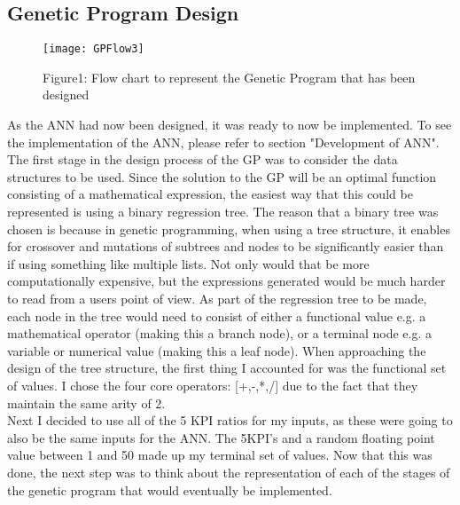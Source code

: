 \documentclass[11pt]{article}
\begin{document}
\subsection{Genetic Program Design}
\begin{figure}[h]
\centering
\texttt{[image: GPFlow3]}
\caption{Figure1: Flow chart to represent the Genetic Program that has been designed} 
\end{figure}
As the ANN had now been designed, it was ready to now be implemented. To see the implementation of the ANN, please refer to section "Development of ANN". The first stage in the design process of the GP was to consider the data structures to be used. Since the solution to the GP will be an optimal function consisting of a mathematical expression, the easiest way that this could be represented is using a binary regression tree. The reason that a binary tree was chosen is because in genetic programming, when using a tree structure, it enables for crossover and mutations of subtrees and nodes to be significantly easier than if using something like multiple lists. Not only would that be more computationally expensive, but the expressions generated would be much harder to read from a users point of view. As part of the regression tree to be made, each node in the tree would need to consist of either a functional value e.g. a mathematical operator (making this a branch node), or a terminal node e.g. a variable or numerical value (making this a leaf node). When approaching the design of the tree structure, the first thing I accounted for was the functional set of values. I chose the four core operators: [+,-,*,/] due to the fact that they maintain the same arity of 2.\\
 Next I decided to use all of the 5 KPI ratios for my inputs, as these were going to also be the same inputs for the ANN. The 5KPI's and a random floating point value between 1 and 50 made up my terminal set of values. Now that this was done, the next step was to think about the representation of each of the stages of the genetic program that would eventually be implemented. 
 
\end{document}
